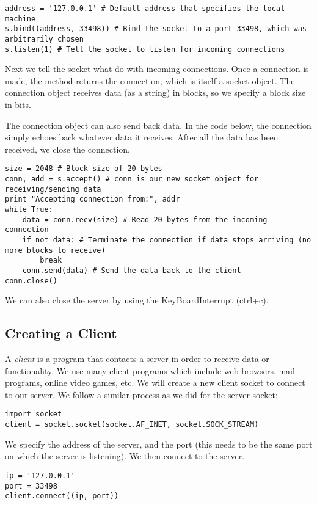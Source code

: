 \begin{lstlisting}
address = '127.0.0.1' # Default address that specifies the local machine
s.bind((address, 33498)) # Bind the socket to a port 33498, which was arbitrarily chosen
s.listen(1) # Tell the socket to listen for incoming connections
\end{lstlisting}

Next we tell the socket what do with incoming connections.
Once a connection is made, the  method returns the connection, which is itself a socket object.
The connection object receives data (as a string) in blocks, so we specify a block size in bits.

The connection object can also send back data.
In the code below, the connection simply echoes back whatever data it receives.
After all the data has been received, we close the connection.


\begin{lstlisting}
size = 2048 # Block size of 20 bytes
conn, add = s.accept() # conn is our new socket object for receiving/sending data
print "Accepting connection from:", addr
while True:
	data = conn.recv(size) # Read 20 bytes from the incoming connection
	if not data: # Terminate the connection if data stops arriving (no more blocks to receive)
		break
	conn.send(data) # Send the data back to the client
conn.close()
\end{lstlisting}

We can also close the server by using the KeyBoardInterrupt (ctrl+c).

\subsection*{Creating a Client}
A \textit{client} is a program that contacts a server in order to receive data or functionality. We use many client programs which include web browsers, mail programs, online video games, etc.
We will create a new client socket to connect to our server. We follow a similar process as we did for the server socket:

\begin{lstlisting}
import socket
client = socket.socket(socket.AF_INET, socket.SOCK_STREAM)
\end{lstlisting}

We specify the address of the server, and the port (this needs to be the same port on which the server is listening). We then connect to the server.

\begin{lstlisting}
ip = '127.0.0.1'
port = 33498
client.connect((ip, port))
\end{lstlisting}

